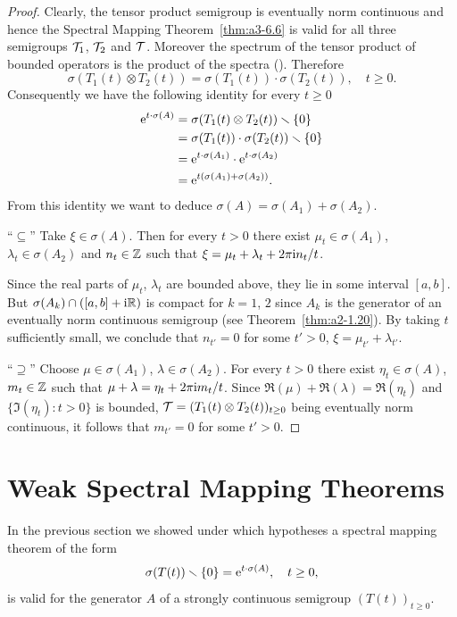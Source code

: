 \begin{proof}
Clearly, the tensor product semigroup is eventually norm continuous and hence the Spectral Mapping Theorem~\ref{thm:a3-6.6} is valid for all three semigroups $\mathcal{T}_{1}$, $\mathcal{T}_{2}$ and $\mathcal{T}$.
Moreover the spectrum of the tensor product of bounded operators is the product of the spectra 
(\textcite[XIII.9]{reedsimon:1978}).
Therefore
\[
	\sigma(T_{1}(t)\otimes T_{2}(t)) = \sigma(T_{1}(t))\cdot\sigma(T_{2}(t)), \quad t \geq 0 .
\]
Consequently we have the following identity for every $t \geq 0$ 
\begin{align*}
\mathrm{e}^{t\cdot\sigma(A)} &= \sigma(T_{1}(t)\otimes T_{2}(t)) \smallsetminus \{0\} \\
&= \sigma(T_{1}(t))\cdot\sigma(T_{2}(t)) \smallsetminus \{0\} \\
&= \mathrm{e}^{t\cdot\sigma(A_{1})}\cdot \mathrm{e}^{t\cdot\sigma(A_{2})} \\
&= \mathrm{e}^{t(\sigma(A_{1})+\sigma(A_{2}))} .
\end{align*}
From this identity we want to deduce $\sigma(A) = \sigma(A_{1}) + \sigma(A_{2})$.

\enquote{$\subseteq$}\quad 
Take $\xi \in \sigma(A)$.
Then for every $t > 0$ there exist $\mu_{t} \in \sigma(A_{1})$, $\lambda_{t} \in \sigma(A_{2})$ and $n_{t} \in \mathbb{Z}$ such that $\xi = \mu_{t} + \lambda_{t} + 2\pi\mathrm{i}  n_{t}/t$.

Since the real parts of\/ $\mu_{t}$, $\lambda_{t}$ are bounded above, they lie in some interval $[a,b]$.
But $\sigma(A_{k}) \cap ( [a,b] + \mathrm{i} \mathbb{R} )$ is compact for $k = 1$, $2$  since $A_{k}$ is the generator of an eventually norm continuous semigroup (see Theorem~\ref{thm:a2-1.20}).
By taking $t$ sufficiently small, we conclude that $n_{t'} = 0$ for some $t' > 0$, \ie $\xi = \mu_{t'} + \lambda_{t'}$.

\enquote{$\supseteq$}\quad 
Choose $\mu \in \sigma(A_{1})$, $\lambda \in \sigma(A_{2})$.
For every $t > 0$ there exist $\eta_{t} \in \sigma(A)$, $m_{t} \in \mathbb{Z}$ such that $\mu + \lambda = \eta_{t} + 2\pi \mathrm{i} m_{t}/t$.
Since $\Re(\mu) + \Re(\lambda) = \Re(\eta_{t})$ and $\{\Im(\eta_{t}) \colon t > 0\}$ is bounded, 
$\TT = (T_{1}(t) \otimes T_{2}(t))_{t\geq 0}$ being eventually norm continuous, it follows that $m_{t'} = 0$ for some $t' > 0$.
\end{proof}
\section{Weak Spectral Mapping Theorems}\label{sec:a3-7}%
In the previous section we showed under which hypotheses a spectral mapping theorem of the form
\begin{equation}\label{eq:a3-7.1}
	\sigma(T(t)) \setminus \{0\} = \eu^{t \cdot \sigma(A)}, \quad t \geq 0 ,
\end{equation}
is valid for the generator $A$ of a strongly continuous semigroup $(T(t))_{t\geq 0}$.

